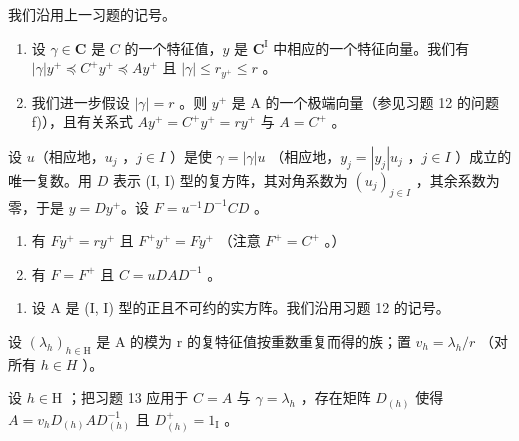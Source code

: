 我们沿用上一习题的记号。

\begin{enumerate}
\def\labelenumi{\alph{enumi})}
\item
  设 \(\gamma \in \mathbf{C}\) 是 \(C\) 的一个特征值，\(y\) 是 \(\mathbf{C}^{\mathrm{I}}\) 中相应的一个特征向量。我们有 \(|\gamma|y^{+} \preccurlyeq C^{+}y^{+} \preccurlyeq Ay^{+}\) 且 \(|\gamma| \leqslant r_{y^{+}} \leqslant r\) 。
\item
  我们进一步假设 \(|\gamma| = r\) 。则 \(y^{+}\) 是 A 的一个极端向量（参见习题 12 的问题 f)），且有关系式 \(Ay^{+} = C^{+}y^{+} = ry^{+}\) 与 \(A = C^{+}\) 。
\end{enumerate}

设 \(u\)（相应地，\(u_j\) ，\(j \in I\) ）是使 \(\gamma = |\gamma|u\) （相应地，\(y_j = |y_j|u_j\) ，\(j \in I\) ）成立的唯一复数。用 \(D\) 表示 (I, I) 型的复方阵，其对角系数为 \((u_j)_{j \in I}\) ，其余系数为零，于是 \(y = Dy^+\)。设 \(F = u^{-1}D^{-1}CD\) 。

\begin{enumerate}
\def\labelenumi{\alph{enumi})}
\setcounter{enumi}{2}
\item
  有 \(Fy^{+} = ry^{+}\) 且 \(F^{+}y^{+} = Fy^{+}\) （注意 \(F^{+} = C^{+}\) 。）
\item
  有 \(F = F^{+}\) 且 \(C = uDAD^{-1}\) 。
\end{enumerate}

\begin{enumerate}
\def\labelenumi{\arabic{enumi})}
\setcounter{enumi}{13}
\tightlist
\item
  设 A 是 (I, I) 型的正且不可约的实方阵。我们沿用习题 12 的记号。
\end{enumerate}

设 \((\lambda_{h})_{h\in\mathrm{H}}\) 是 A 的模为 r 的复特征值按重数重复而得的族；置 \(v_{h}=\lambda_{h}/r\) （对所有 \(h\in H\) ）。

设 \(h \in \mathrm{H}\) ；把习题 13 应用于 \(C = A\) 与 \(\gamma = \lambda_h\) ，存在矩阵 \(D_{(h)}\) 使得 \(A = v_h D_{(h)} AD_{(h)}^{-1}\) 且 \(D_{(h)}^+ = 1_{\mathrm{I}}\) 。

